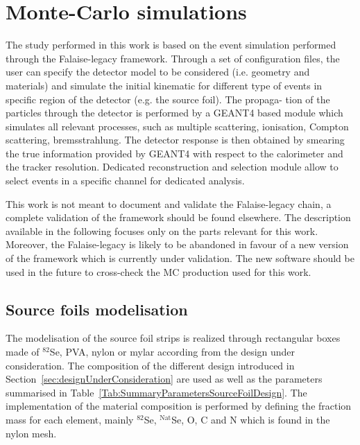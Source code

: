 \documentclass[main.tex]{subfiles}
\begin{document}
\FloatBarrier


\section{Monte-Carlo simulations}\label{sec:MCsimulations}


\NI The study performed in this work is based on the event simulation performed through the Falaise-legacy framework. Through a set of configuration files, the user can specify the detector model to be considered (i.e. geometry and materials) and simulate the initial kinematic for different type of events in specific region of the detector (e.g. the source foil). The propaga- tion of the particles through the detector is performed by a GEANT4 based module which simulates all relevant processes, such as multiple scattering, ionisation, Compton scattering, bremsstrahlung. The detector response is then obtained by smearing the true information provided by GEANT4 with respect to the calorimeter and the tracker resolution. Dedicated reconstruction and selection module allow to select events in a specific channel for dedicated analysis.


\bigskip


\NI This work is not meant to document and validate the Falaise-legacy chain, a complete validation of the framework should be found elsewhere. The description available in the following focuses only on the parts relevant for this work. Moreover, the Falaise-legacy is likely to be abandoned in favour of a new version of the framework which is currently under validation. The new software should be used in the future to cross-check the MC production used for this work.


\subsection{Source foils modelisation}


\NI The modelisation of the source foil strips is realized through rectangular boxes made of $^{\text{82}}$Se, PVA, nylon or mylar according from the design under consideration. The composition of the different design introduced in Section~\ref{sec:designUnderConsideration} are used as well as the parameters summarised in Table~\ref{Tab:SummaryParametersSourceFoilDesign}. The implementation of the material composition is performed by defining the fraction mass for each element, mainly $^{\text{82}}$Se, $^{\text{Nat}}$Se, O, C and N which is found in the nylon mesh.
\end{document}
